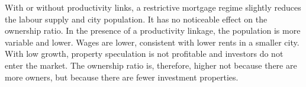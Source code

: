 With or without productivity links, a restrictive mortgage regime slightly reduces the labour supply and city population. It has no noticeable effect on the ownership ratio. In the presence of a productivity linkage, the population is more variable and lower. %
Wages are lower, consistent with lower rents in a smaller city. With low growth, property speculation is not profitable and investors do not enter the market. The ownership ratio is, therefore, higher not because there are more owners, but because there are fewer investment properties. 

